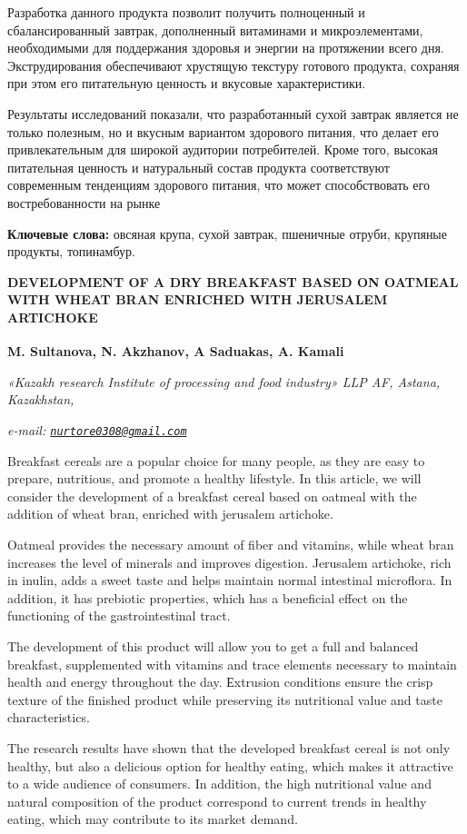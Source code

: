 Разработка данного продукта позволит получить полноценный и
сбалансированный завтрак, дополненный витаминами и микроэлементами,
необходимыми для поддержания здоровья и энергии на протяжении всего дня.
Экструдирования обеспечивают хрустящую текстуру готового продукта,
сохраняя при этом его питательную ценность и вкусовые характеристики.

Результаты исследований показали, что разработанный сухой завтрак
является не только полезным, но и вкусным вариантом здорового питания,
что делает его привлекательным для широкой аудитории потребителей. Кроме
того, высокая питательная ценность и натуральный состав продукта
соответствуют современным тенденциям здорового питания, что может
способствовать его востребованности на рынке

{\bfseries Ключевые слова:} овсяная крупа, сухой завтрак, пшеничные отруби,
крупяные продукты, топинамбур.

{\bfseries DEVELOPMENT OF A DRY BREAKFAST BASED ON OATMEAL WITH WHEAT BRAN
ENRICHED WITH JERUSALEM ARTICHOKE}

{\bfseries M. Sultanova, N. Akzhanov\textsuperscript{\envelope }, A Saduakas, A.
Kamali}

\emph{«Kazakh research Institute of processing and food industry» LLP
AF, Astana, Kazakhstan,}

\emph{e-mail:
\href{mailto:nurtore0308@gmail.com}{\nolinkurl{nurtore0308@gmail.com}}}

Breakfast cereals are a popular choice for many people, as they are easy
to prepare, nutritious, and promote a healthy lifestyle. In this
article, we will consider the development of a breakfast cereal based on
oatmeal with the addition of wheat bran, enriched with jerusalem
artichoke.

Oatmeal provides the necessary amount of fiber and vitamins, while wheat
bran increases the level of minerals and improves digestion. Jerusalem
artichoke, rich in inulin, adds a sweet taste and helps maintain normal
intestinal microflora. In addition, it has prebiotic properties, which
has a beneficial effect on the functioning of the gastrointestinal
tract.

The development of this product will allow you to get a full and
balanced breakfast, supplemented with vitamins and trace elements
necessary to maintain health and energy throughout the day. Еxtrusion
conditions ensure the crisp texture of the finished product while
preserving its nutritional value and taste characteristics.

The research results have shown that the developed breakfast cereal is
not only healthy, but also a delicious option for healthy eating, which
makes it attractive to a wide audience of consumers. In addition, the
high nutritional value and natural composition of the product correspond
to current trends in healthy eating, which may contribute to its market
demand.

